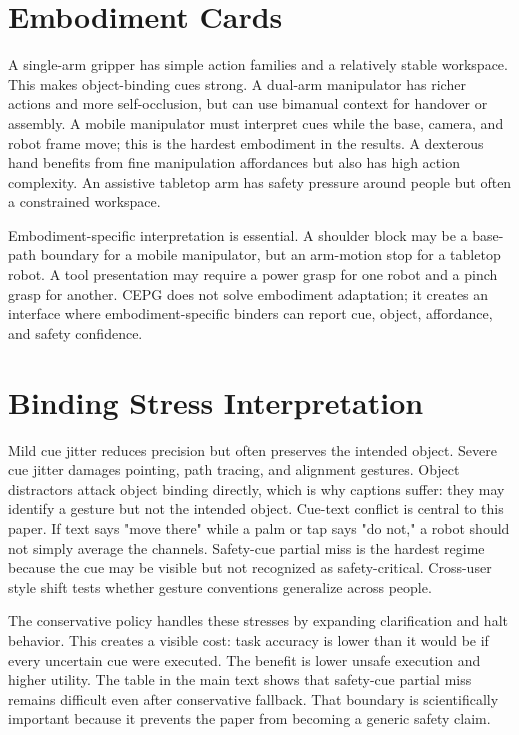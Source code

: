 \documentclass{article}
\newcommand{\method}{CEPG}
\begin{document}
\section{Embodiment Cards}

A single-arm gripper has simple action families and a relatively stable workspace. This makes object-binding cues strong. A dual-arm manipulator has richer actions and more self-occlusion, but can use bimanual context for handover or assembly. A mobile manipulator must interpret cues while the base, camera, and robot frame move; this is the hardest embodiment in the results. A dexterous hand benefits from fine manipulation affordances but also has high action complexity. An assistive tabletop arm has safety pressure around people but often a constrained workspace.

Embodiment-specific interpretation is essential. A shoulder block may be a base-path boundary for a mobile manipulator, but an arm-motion stop for a tabletop robot. A tool presentation may require a power grasp for one robot and a pinch grasp for another. \method{} does not solve embodiment adaptation; it creates an interface where embodiment-specific binders can report cue, object, affordance, and safety confidence.

\section{Binding Stress Interpretation}

Mild cue jitter reduces precision but often preserves the intended object. Severe cue jitter damages pointing, path tracing, and alignment gestures. Object distractors attack object binding directly, which is why captions suffer: they may identify a gesture but not the intended object. Cue-text conflict is central to this paper. If text says "move there" while a palm or tap says "do not," a robot should not simply average the channels. Safety-cue partial miss is the hardest regime because the cue may be visible but not recognized as safety-critical. Cross-user style shift tests whether gesture conventions generalize across people.

The conservative policy handles these stresses by expanding clarification and halt behavior. This creates a visible cost: task accuracy is lower than it would be if every uncertain cue were executed. The benefit is lower unsafe execution and higher utility. The table in the main text shows that safety-cue partial miss remains difficult even after conservative fallback. That boundary is scientifically important because it prevents the paper from becoming a generic safety claim.
\end{document}
